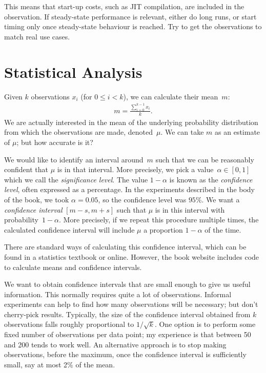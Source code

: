 This means that start-up costs, such as JIT compilation, are included in the
observation.  If steady-state performance is relevant, either do long runs, or
start timing only once steady-state behaviour is reached.  Try to get the
observations to match real use cases.


\section{Statistical Analysis}

Given $k$ observations $x_i$ (for $0 \le i < k$), we can calculate their
mean~$m$:
%
\begin{eqnarray*}
m = \frac{\sum_{i = 0}^{k-1} x_i}{k}.
\end{eqnarray*}
%
We are actually interested in the mean of the underlying probability
distribution from which the observations are made, denoted~$\mu$.  
%
We can take $m$ as an estimate of $\mu$; but how accurate is it?

We would like to identify an interval around~$m$ such that we can be
reasonably confident that $\mu$ is in that interval.
%
More precisely, we pick a value~$\alpha \in [0,1]$ which we call the
\emph{significance level}.  The value $1-\alpha$ is known as the
\emph{confidence level}, often expressed as a percentage.  In the experiments
described in the body of the book, we took $\alpha = 0.05$, so the confidence
level was $95\%$.  We want a \emph{confidence interval} $[m-s, m+s]$ such that
$\mu$ is in this interval with probability~$1-\alpha$.
%
More precisely, if we repeat this procedure multiple times, the calculated
confidence interval will include $\mu$ a proportion $1-\alpha$ of the time. 

There are standard ways of calculating this confidence interval, which can be
found in a statistics textbook or online.  However, the book website includes
code to calculate means and confidence intervals. 

We want to obtain confidence intervals that are small enough to give us useful
information.  This normally requires quite a lot of observations.  Informal
experiments can help to find how many observations will be necessary; but
don't cherry-pick results.  Typically, the size of the confidence interval
obtained from $k$ observations falls roughly proportional to $1/\sqrt{k}$.
One option is to perform some fixed number of observations per data point; my
experience is that between 50 and 200 tends to work well.  An alternative
approach is to stop making observations, before the maximum, once the
confidence interval is sufficiently small, say at most 2\% of the mean.

